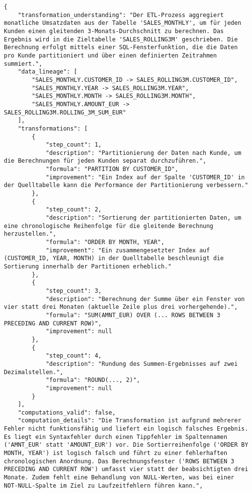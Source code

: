 \begin{lstlisting}[caption={Ausgabe: GEMINI 2.5 Pro Anwendungsfall 8 Robustheitsdurchlauf},label={gemini_case8_prompt3}]
{
    "transformation_understanding": "Der ETL-Prozess aggregiert monatliche Umsatzdaten aus der Tabelle 'SALES_MONTHLY', um für jeden Kunden einen gleitenden 3-Monats-Durchschnitt zu berechnen. Das Ergebnis wird in die Zieltabelle 'SALES_ROLLING3M' geschrieben. Die Berechnung erfolgt mittels einer SQL-Fensterfunktion, die die Daten pro Kunde partitioniert und über einen definierten Zeitrahmen summiert.",
    "data_lineage": [
        "SALES_MONTHLY.CUSTOMER_ID -> SALES_ROLLING3M.CUSTOMER_ID",
        "SALES_MONTHLY.YEAR -> SALES_ROLLING3M.YEAR",
        "SALES_MONTHLY.MONTH -> SALES_ROLLING3M.MONTH",
        "SALES_MONTHLY.AMOUNT_EUR -> SALES_ROLLING3M.ROLLING_3M_SUM_EUR"
    ],
    "transformations": [
        {
            "step_count": 1,
            "description": "Partitionierung der Daten nach Kunde, um die Berechnungen für jeden Kunden separat durchzuführen.",
            "formula": "PARTITION BY CUSTOMER_ID",
            "improvement": "Ein Index auf der Spalte 'CUSTOMER_ID' in der Quelltabelle kann die Performance der Partitionierung verbessern."
        },
        {
            "step_count": 2,
            "description": "Sortierung der partitionierten Daten, um eine chronologische Reihenfolge für die gleitende Berechnung herzustellen.",
            "formula": "ORDER BY MONTH, YEAR",
            "improvement": "Ein zusammengesetzter Index auf (CUSTOMER_ID, YEAR, MONTH) in der Quelltabelle beschleunigt die Sortierung innerhalb der Partitionen erheblich."
        },
        {
            "step_count": 3,
            "description": "Berechnung der Summe über ein Fenster von vier statt drei Monaten (aktuelle Zeile plus drei vorhergehende).",
            "formula": "SUM(AMNT_EUR) OVER (... ROWS BETWEEN 3 PRECEDING AND CURRENT ROW)",
            "improvement": null
        },
        {
            "step_count": 4,
            "description": "Rundung des Summen-Ergebnisses auf zwei Dezimalstellen.",
            "formula": "ROUND(..., 2)",
            "improvement": null
        }
    ],
    "computations_valid": false,
    "computation_details": "Die Transformation ist aufgrund mehrerer Fehler nicht funktionsfähig und liefert ein logisch falsches Ergebnis. Es liegt ein Syntaxfehler durch einen Tippfehler im Spaltennamen ('AMNT_EUR' statt 'AMOUNT_EUR') vor. Die Sortierreihenfolge ('ORDER BY MONTH, YEAR') ist logisch falsch und führt zu einer fehlerhaften chronologischen Anordnung. Das Berechnungsfenster ('ROWS BETWEEN 3 PRECEDING AND CURRENT ROW') umfasst vier statt der beabsichtigten drei Monate. Zudem fehlt eine Behandlung von NULL-Werten, was bei einer NOT-NULL-Spalte im Ziel zu Laufzeitfehlern führen kann.",

\end{lstlisting}
